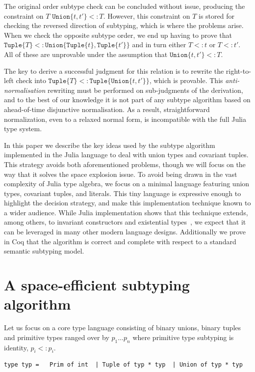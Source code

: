 \documentclass[a4paper,english]{lipics-v2019}
\newcommand{\xt}[1]{\texttt{#1}}
\newcommand{\union}[2]{\xt{Union\{}#1,#2\xt{\}}}
\newcommand{\tuple}[1]{\xt{Tuple\{}#1\xt{\}}}
\begin{document}
The original order subtype check can be concluded without issue, producing
the constraint on $T$ {\small$\union{t}{t'} <: T$}. However, this constraint
on $T$ is stored for checking the reversed direction of subtyping, which is
where the problems arise. When we check the opposite subtype order, we end
up having to prove that {\small$\tuple{T}<:\union{\tuple{t}}{\tuple{t'}}$}
and in turn either {\small$T<:t$} or {\small$T<:t'$}. All of these are
unprovable under the assumption that {\small$\union{t}{t'} <: T$}.

The key to derive a successful judgment for this relation is to rewrite the
right-to-left check into {\small$\tuple{T}<:\tuple{\union{t}{t'}}$}, which is
provable. This \emph{anti-normalisation} rewriting must be performed on
sub-judgments of the derivation, and to the best of our knowledge it is not
part of any subtype algorithm based on ahead-of-time disjunctive
normalisation. As a result, straightforward normalization, even to a relaxed
normal form, is incompatible with the full Julia type system.

In this paper we describe the key ideas used by the subtype algorithm
implemented in the Julia language to deal with union types and covariant
tuples. This strategy avoids both aforementioned problems, though we will
focus  on the way that it solves the space explosion issue. To avoid being
drawn in the vast complexity of Julia type algebra, we focus on a minimal
language featuring union types, covariant tuples, and literals. This tiny
language is expressive enough to highlight the decision strategy, and make
this implementation technique known to a wider audience.  While Julia
implementation shows that this technique extends, among others, to invariant
constructors and existential types~\cite{DBLP:NardelliBPCBV18}, we expect that
it can be leveraged in many other modern language designs. Additionally we
prove in Coq that the algorithm is correct and complete with respect to a
standard semantic subtyping model.


\section{A space-efficient subtyping algorithm}

Let us focus on a core type language consisting of binary unions, binary
tuples and primitive types ranged over by $p_1 \dots p_n$ where primitive
type subtyping is identity, $p_i <: p_i$.

\medskip
\begin{lstlisting}
type typ =   Prim of int  | Tuple of typ * typ  | Union of typ * typ
\end{lstlisting}
\medskip
\end{document}
